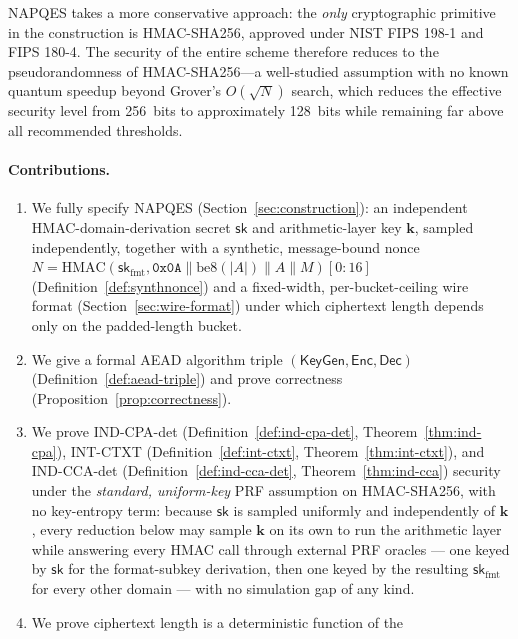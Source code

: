 \documentclass[11pt,a4paper]{article}
\begin{document}
NAPQES takes a more conservative approach: the \emph{only} cryptographic
primitive in the construction is HMAC-SHA256, approved under NIST FIPS
198-1 and FIPS 180-4. The security of the entire scheme therefore reduces
to the pseudorandomness of HMAC-SHA256—a well-studied assumption with no
known quantum speedup beyond Grover's $O(\sqrt{N})$ search, which reduces
the effective security level from 256~bits to approximately 128~bits while
remaining far above all recommended thresholds.

\paragraph{Contributions.}
\begin{enumerate}
  \item We fully specify NAPQES (Section~\ref{sec:construction}): an
        independent HMAC-domain-derivation secret $\mathsf{sk}$ and
        arithmetic-layer key $\mathbf{k}$, sampled independently, together
        with a synthetic, message-bound nonce
        $N=\mathrm{HMAC}(\mathsf{sk}_{\mathrm{fmt}},\texttt{0x0A}\|\mathrm{be8}(|A|)\|A\|M)[0{:}16]$
        (Definition~\ref{def:synthnonce}) and a fixed-width, per-bucket-ceiling
        wire format (Section~\ref{sec:wire-format}) under which ciphertext
        length depends only on the padded-length bucket.
  \item We give a formal AEAD algorithm triple
        $(\mathsf{KeyGen},\mathsf{Enc},\mathsf{Dec})$
        (Definition~\ref{def:aead-triple}) and prove correctness
        (Proposition~\ref{prop:correctness}).
  \item We prove IND-CPA-det (Definition~\ref{def:ind-cpa-det},
        Theorem~\ref{thm:ind-cpa}), INT-CTXT
        (Definition~\ref{def:int-ctxt}, Theorem~\ref{thm:int-ctxt}), and
        IND-CCA-det (Definition~\ref{def:ind-cca-det},
        Theorem~\ref{thm:ind-cca}) security under the \emph{standard,
        uniform-key}
        PRF assumption on HMAC-SHA256, with no key-entropy term: because
        $\mathsf{sk}$ is sampled uniformly and independently of
        $\mathbf{k}$, every reduction below may sample $\mathbf{k}$ on its
        own to run the arithmetic layer while answering every HMAC call
        through external PRF oracles — one keyed by $\mathsf{sk}$ for the
        format-subkey derivation, then one keyed by the resulting
        $\mathsf{sk}_{\mathrm{fmt}}$ for every other domain — with no
        simulation gap of any kind.
  \item We prove ciphertext length is a deterministic function of the

\end{enumerate}
\end{document}
